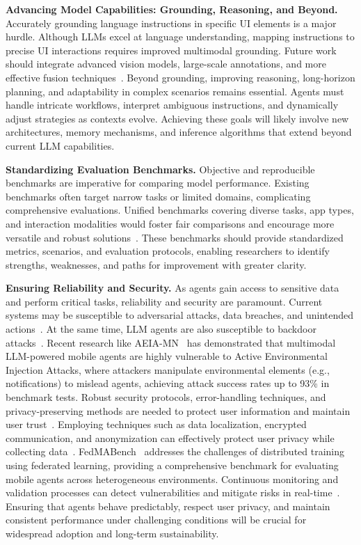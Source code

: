 \noindent\textbf{Advancing Model Capabilities: Grounding, Reasoning, and Beyond.}
Accurately grounding language instructions in specific UI elements is a major hurdle. Although LLMs excel at language understanding, mapping instructions to precise UI interactions requires improved multimodal grounding. Future work should integrate advanced vision models, large-scale annotations, and more effective fusion techniques~\cite{gou2024navigating, cheng2024seeclick, you2024ferret, zhang2024ui-hawk}.
Beyond grounding, improving reasoning, long-horizon planning, and adaptability in complex scenarios remains essential. Agents must handle intricate workflows, interpret ambiguous instructions, and dynamically adjust strategies as contexts evolve. Achieving these goals will likely involve new architectures, memory mechanisms, and inference algorithms that extend beyond current LLM capabilities.


\noindent\textbf{Standardizing Evaluation Benchmarks.}
Objective and reproducible benchmarks are imperative for comparing model performance. Existing benchmarks often target narrow tasks or limited domains, complicating comprehensive evaluations. Unified benchmarks covering diverse tasks, app types, and interaction modalities would foster fair comparisons and encourage more versatile and robust solutions~\cite{wang2024mobileagentbench, xu2024androidlab, lu2024guiodyssey, rawles2024androidinthewild}.
These benchmarks should provide standardized metrics, scenarios, and evaluation protocols, enabling researchers to identify strengths, weaknesses, and paths for improvement with greater clarity.


\noindent\textbf{Ensuring Reliability and Security.}
As agents gain access to sensitive data and perform critical tasks, reliability and security are paramount. Current systems may be susceptible to adversarial attacks, data breaches, and unintended actions~\cite{wu2024adversarial}. At the same time, LLM agents are also susceptible to backdoor attacks~\cite{yang2024watch,wang2024badagent}. Recent research like AEIA-MN~\cite{chen2025aeia} has demonstrated that multimodal LLM-powered mobile agents are highly vulnerable to Active Environmental Injection Attacks, where attackers manipulate environmental elements (e.g., notifications) to mislead agents, achieving attack success rates up to 93\% in benchmark tests. Robust security protocols, error-handling techniques, and privacy-preserving methods are needed to protect user information and maintain user trust~\cite{ma2024coco,bai2024digirl}. Employing techniques such as data localization, encrypted communication, and anonymization can effectively protect user privacy while collecting data~\cite{wang2025fedmobileagent}. FedMABench~\cite{wang2025fedmabench} addresses the challenges of distributed training using federated learning, providing a comprehensive benchmark for evaluating mobile agents across heterogeneous environments.
Continuous monitoring and validation processes can detect vulnerabilities and mitigate risks in real-time~\cite{lee2023exploremobilegpt}. Ensuring that agents behave predictably, respect user privacy, and maintain consistent performance under challenging conditions will be crucial for widespread adoption and long-term sustainability.


